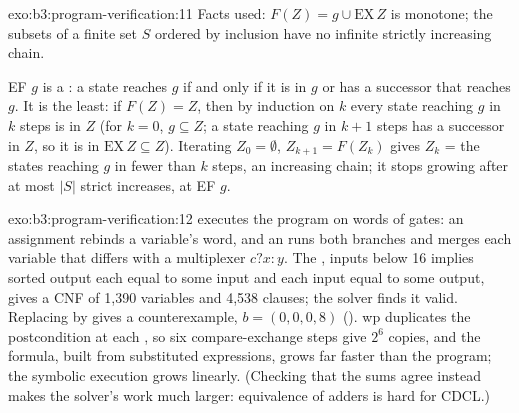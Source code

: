 \begin{solution}{exo:b3:program-verification:11}
Facts used: $F(Z) = g \cup \mathrm{EX}\,Z$ is monotone; the subsets of a finite set $S$ ordered by inclusion have no infinite strictly increasing chain.

EF $g$ is a : a state reaches $g$ if and only if it is in $g$ or has a successor that reaches $g$. It is the least: if $F(Z) = Z$, then by induction on $k$ every state reaching $g$ in $k$ steps is in $Z$ (for $k = 0$, $g \subseteq Z$; a state reaching $g$ in $k + 1$ steps has a successor in $Z$, so it is in $\mathrm{EX}\,Z \subseteq Z$). Iterating $Z_0 = \emptyset$, $Z_{k+1} = F(Z_k)$ gives $Z_k$ = the states reaching $g$ in fewer than $k$ steps, an increasing chain; it stops growing after at most $|S|$ strict increases, at EF $g$.
\end{solution}

\begin{solution}{exo:b3:program-verification:12}
 executes the program on words of gates: an assignment rebinds a variable's word, and an  runs both branches and merges each variable that differs with a multiplexer $c ? x : y$. The , inputs below 16 implies sorted output each equal to some input and each input equal to some output, gives a CNF of 1,390 variables and 4,538 clauses; the solver finds it valid. Replacing  by  gives a counterexample, $b = (0, 0, 0, 8)$ (). wp duplicates the postcondition at each , so six compare-exchange steps give $2^6$ copies, and the formula, built from substituted expressions, grows far faster than the program; the symbolic execution grows linearly. (Checking that the sums agree instead makes the solver's work much larger: equivalence of adders is hard for CDCL.)
\end{solution}

